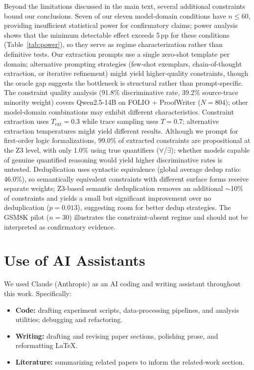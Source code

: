 Beyond the limitations discussed in the main text, several additional constraints bound our conclusions. Seven of our eleven model-domain conditions have $n \leq 60$, providing insufficient statistical power for confirmatory claims; power analysis shows that the minimum detectable effect exceeds 5\,pp for these conditions (Table~\ref{tab:power}), so they serve as regime characterization rather than definitive tests. Our extraction prompts use a single zero-shot template per domain; alternative prompting strategies (few-shot exemplars, chain-of-thought extraction, or iterative refinement) might yield higher-quality constraints, though the oracle gap suggests the bottleneck is structural rather than prompt-specific. The constraint quality analysis (91.8\% discriminative rate, 39.2\% source-trace minority weight) covers Qwen2.5-14B on FOLIO + ProofWriter ($N = 804$); other model-domain combinations may exhibit different characteristics. Constraint extraction uses $T_{\text{ext}} = 0.3$ while trace sampling uses $T = 0.7$; alternative extraction temperatures might yield different results. Although we prompt for first-order logic formalizations, 99.0\% of extracted constraints are propositional at the Z3 level, with only 1.0\% using true quantifiers ($\forall$/$\exists$); whether models capable of genuine quantified reasoning would yield higher discriminative rates is untested. Deduplication uses syntactic equivalence (global average dedup ratio: 46.0\%), so semantically equivalent constraints with different surface forms receive separate weights; Z3-based semantic deduplication removes an additional ${\sim}$10\% of constraints and yields a small but significant improvement over no deduplication ($p = 0.013$), suggesting room for better dedup strategies. The GSM8K pilot ($n = 30$) illustrates the constraint-absent regime and should not be interpreted as confirmatory evidence.

\section{Use of AI Assistants}
\label{app:ai-assistants}

We used Claude (Anthropic) as an AI coding and writing assistant
throughout this work. Specifically:
\begin{itemize}
    \item \textbf{Code:} drafting experiment scripts, data-processing
    pipelines, and analysis utilities; debugging and refactoring.
    \item \textbf{Writing:} drafting and revising paper sections,
    polishing prose, and reformatting LaTeX.
    \item \textbf{Literature:} summarizing related papers to inform
    the related-work section.
\end{itemize}
